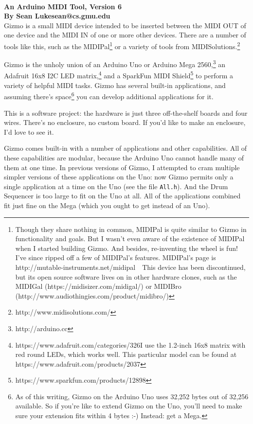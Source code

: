 \documentclass{article}
\begin{document}
\\[0.5em]
{\large \bf An Arduino MIDI Tool, Version 6\\
By Sean Luke\quad sean@cs.gmu.edu} 
\\


\noindent Gizmo is a small MIDI device intended to be inserted between the MIDI OUT of one device and the MIDI IN of one or more other devices.  There are a number of tools like this, such as the MIDIPal\footnote{Though they share nothing in common, MIDIPal is quite similar to Gizmo in functionality and goals.  But I wasn't even aware of the existence of MIDIPal when I started building Gizmo.  And besides, re-inventing the wheel is fun!  I've since ripped off a few of MIDIPal's features.  MIDIPal's page is http:/\!/mutable-instruments.net/midipal\ \ This device has been discontinued, but its open source software lives on in other hardware clones, such as the MIDIGal (https:/\!/midisizer.com/midigal/) or MIDIBro (http:/\!/www.audiothingies.com/product/midibro/)} or a variety of tools from MIDISolutions.\footnote{http:/\!/www.midisolutions.com/}

Gizmo is the unholy union of an Arduino Uno or Arduino Mega 2560,\footnote{http:/\!/arduino.cc} an Adafruit 16x8 I2C LED matrix,\footnote{https:/\!/www.adafruit.com/categories/326\quad I use the 1.2-inch 16x8 matrix with red round LEDs, which works well.  This particular model can be found at https:/\!/www.adafruit.com/products/2037} and a SparkFun MIDI Shield\footnote{https:/\!/www.sparkfun.com/products/12898} to perform a variety of helpful MIDI tasks.  Gizmo has several built-in applications, and assuming there's space\footnote{As of this writing, Gizmo on the Arduino Uno uses 32,252 bytes out of 32,256 available.  So if you're like to extend Gizmo on the Uno, you'll need to make sure your extension fits within 4 bytes :-)  Instead: get a Mega.} you can develop additional applications for it.

This is a software project: the hardware is just three off-the-shelf boards and four wires.  There's no enclosure, no custom board.  If you'd like to make an enclosure, I'd love to see it.

Gizmo comes built-in with a number of applications and other capabilities.  All of these capabilities are modular, because the Arduino Uno cannot handle many of them at one time.  In previous versions of Gizmo, I attempted to cram multiple simpler versions of these applications on the Uno: now Gizmo permits only a single application at a time on the Uno (see the file \texttt{All.h}).  And the Drum Sequencer is too large to fit on the Uno at all.  All of the applications combined fit just fine on the Mega (which you ought to get instead of an Uno).
\end{document}
